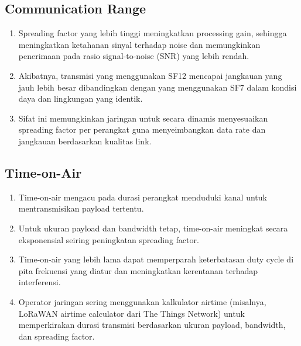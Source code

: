 \subsection{Communication Range}
\begin{enumerate}
    \item Spreading factor yang lebih tinggi meningkatkan processing gain, sehingga meningkatkan ketahanan sinyal terhadap noise dan memungkinkan penerimaan pada rasio signal-to-noise (SNR) yang lebih rendah.
    \item Akibatnya, transmisi yang menggunakan SF12 mencapai jangkauan yang jauh lebih besar dibandingkan dengan yang menggunakan SF7 dalam kondisi daya dan lingkungan yang identik.
    \item Sifat ini memungkinkan jaringan untuk secara dinamis menyesuaikan spreading factor per perangkat guna menyeimbangkan data rate dan jangkauan berdasarkan kualitas link.
\end{enumerate}
\subsection{Time-on-Air}
\begin{enumerate}
    \item Time-on-air mengacu pada durasi perangkat menduduki kanal untuk mentransmisikan payload tertentu.
    \item Untuk ukuran payload dan bandwidth tetap, time-on-air meningkat secara eksponensial seiring peningkatan spreading factor.
    \item Time-on-air yang lebih lama dapat memperparah keterbatasan duty cycle di pita frekuensi yang diatur dan meningkatkan kerentanan terhadap interferensi.
    \item Operator jaringan sering menggunakan kalkulator airtime (misalnya, LoRaWAN airtime calculator dari The Things Network) untuk memperkirakan durasi transmisi berdasarkan ukuran payload, bandwidth, dan spreading factor.
\end{enumerate}
